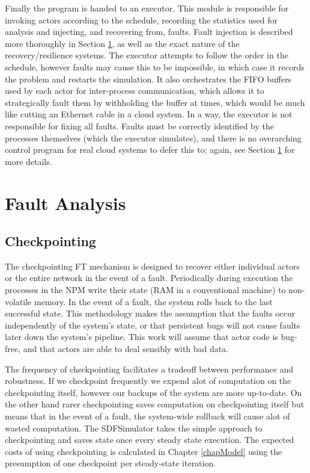 Finally the program is handed to an executor.
This module is responsible for invoking actors according to the schedule, recording the statistics used for analysis and injecting, and recovering from, faults.
Fault injection is described more thoroughly in Section \ref{secSystemFault}, as well as the exact nature of the recovery/resilience systems.
The executor attempts to follow the order in the schedule, however faults may cause this to be impossible, in which case it records the problem and restarts the simulation.
It also orchestrates the FIFO buffers used by each actor for inter-process communication, which allows it to strategically fault them by withholding the buffer at times, which would be much like cutting an Ethernet cable in a cloud system.
In a way, the executor is not responsible for fixing all faults.
Faults must be correctly identified by the processes themselves (which the executor simulates), and there is no overarching control program for real cloud systems to defer this to; again, see Section \ref{secSystemFault} for more details.

\section{Fault Analysis}
\label{secSystemFault}
\subsection{Checkpointing}

The checkpointing FT mechanism is designed to recover either individual actors or the entire network in the event of a fault.
Periodically during execution the processes in the NPM write their state (RAM in a conventional machine) to non-volatile memory.
In the event of a fault, the system rolls back to the last successful state.
This methodology makes the assumption that the faults occur independently of the system's state, or that persistent bugs will not cause faults later down the system's pipeline.
This work will assume that actor code is bug-free, and that actors are able to deal sensibly with bad data.

The frequency of checkpointing facilitates a tradeoff between performance and robustness.
If we checkpoint frequently we expend alot of computation on the checkpointing itself, however our backups of the system are more up-to-date.
On the other hand rarer checkpointing saves computation on checkpointing itself but means that in the event of a fault, the system-wide rollback will cause alot of wasted computation.
The SDFSimulator takes the simple approach to checkpointing and saves state once every steady state execution.
The expected costs of using checkpointing is calculated in Chapter \ref{chapModel} using the presumption of one checkpoint per steady-state iteration.

